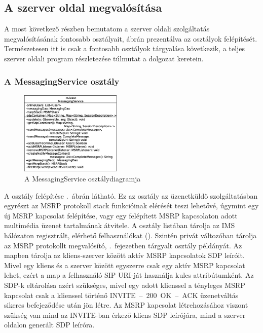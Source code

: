 \newpage
\newpage

\subsection{A szerver oldal megvalósítása}

A most következő részben bemutatom a szerver oldali szolgáltatás megvalósításának fontosabb osztályait, ábrán prezentálva az osztályok felépítését. Természetesen itt is csak a fontosabb osztályok tárgyalása következik, a teljes szerver oldali program részletezése túlmutat a dolgozat keretein.

\subsubsection*{A MessagingService osztály}
\label{sec:server_messagingservice}

\begin{figure}
  \vspace{-15pt}
  \begin{center}
    \includegraphics[width=0.43\textwidth]{img/class_diagrams/server/eps/MessagingService.eps}
  \end{center}
  \vspace{-15pt}
  \captionsetup{font=scriptsize}
  \caption{A MessagingService osztálydiagramja}
   \label{fig:class_server_messagingservice}
  \vspace{-10pt}
\end{figure}

A  osztály felépítése .~ábrán látható. Ez az osztály az üzenetküldő szolgáltatásban egyrészt az MSRP protokoll stack funkcióinak elérését teszi lehetővé, úgymint egy új MSRP kapcsolat felépítése, vagy egy felépített MSRP kapcsolaton adott multimédia üzenet tartalmának átvitele. A  osztály listában tárolja az IMS hálózaton regisztrált, elérhető felhasználókat (). Szintén privát változóban tárolja az MSRP protokollt megvalósító, .~fejezetben tárgyalt  osztály példányát. Az  mapben tárolja az kliens-szerver között aktív MSRP kapcsolatok SDP leíróit. Mivel egy kliens és a szerver között egyszerre csak egy aktív MSRP kapcsolat lehet, ezért a map a felhasználó SIP URI-ját használja kulcs attribútumként. Az SDP-k eltárolása azért szükséges, mivel egy adott klienssel a tényleges MSRP kapcsolat csak a klienssel történő INVITE~--~200~OK~--~ACK üzenetváltás sikeres befejeződése után jön létre. Az MSRP kapcsolat létrehozásához viszont szükség van mind az INVITE-ban érkező kliens SDP leírójára, mind a szerver oldalon generált SDP leíróra.

